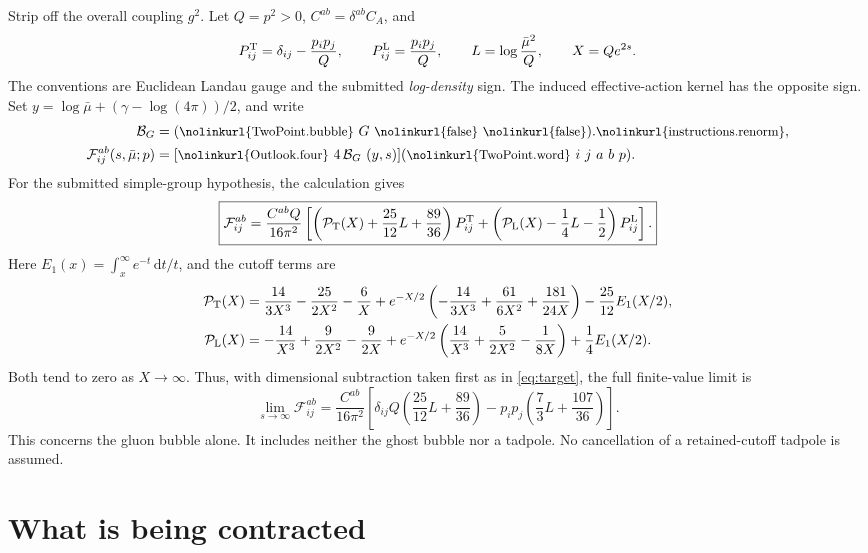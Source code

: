 \documentclass[11pt]{article}
\newcommand{\code}[1]{\ifmmode\text{\small\nolinkurl{#1}}\else{\small\nolinkurl{#1}}\fi}
\newcommand{\dd}{\,\mathrm d}
\begin{document}
Strip off the overall coupling $g^2$. Let $Q=p^2>0$,
$C^{ab}=\delta^{ab}C_A$, and
\[
 P^{\rm T}_{ij}=\delta_{ij}-\frac{p_i p_j}{Q},\qquad
 P^{\rm L}_{ij}=\frac{p_i p_j}{Q},\qquad
 L=\log\frac{\bar\mu^2}{Q},\qquad X=Qe^{2s}.
\]
The conventions are Euclidean Landau gauge and the submitted \emph{log-density}
sign. The induced effective-action kernel has the opposite sign.
Set $y=\log\bar\mu+(\gamma-\log(4\pi))/2$, and write
\begin{equation}
 \begin{aligned}
 \mathcal B_G&=(\code{TwoPoint.bubble}\ G\ \code{false}\ \code{false}).
 \code{instructions.renorm},\\
 \mathcal F^{ab}_{ij}(s,\bar\mu;p)&=
 [\code{Outlook.four}\ 4\,\mathcal B_G\ (y,s)]
 (\code{TwoPoint.word}\ i\ j\ a\ b\ p).
 \end{aligned}
 \label{eq:target}
\end{equation}
For the submitted simple-group hypothesis, the calculation gives
\begin{equation}
 \boxed{\displaystyle
 \mathcal F^{ab}_{ij}
 =\frac{C^{ab}Q}{16\pi^2}
 \left[
 \left(\mathcal P_{\rm T}(X)+\frac{25}{12}L+\frac{89}{36}\right)P^{\rm T}_{ij}
 +\left(\mathcal P_{\rm L}(X)-\frac14 L-\frac12\right)P^{\rm L}_{ij}
 \right].}
 \label{eq:cutoff}
\end{equation}
Here $E_1(x)=\int_x^\infty e^{-t}\dd t/t$, and the cutoff terms are
\begin{align}
 \mathcal P_{\rm T}(X)
 &=\frac{14}{3X^3}-\frac{25}{2X^2}-\frac6X
 +e^{-X/2}\left(-\frac{14}{3X^3}+\frac{61}{6X^2}+\frac{181}{24X}\right)
 -\frac{25}{12}E_1(X/2),\label{eq:PT}\\
 \mathcal P_{\rm L}(X)
 &=-\frac{14}{X^3}+\frac{9}{2X^2}-\frac{9}{2X}
 +e^{-X/2}\left(\frac{14}{X^3}+\frac{5}{2X^2}-\frac{1}{8X}\right)
 +\frac14 E_1(X/2).\label{eq:PL}
\end{align}
Both tend to zero as $X\to\infty$. Thus, with dimensional subtraction taken
first as in \eqref{eq:target}, the full finite-value limit is
\begin{equation}
 \boxed{\displaystyle
 \lim_{s\to\infty}\mathcal F^{ab}_{ij}
 =\frac{C^{ab}}{16\pi^2}
 \left[
 \delta_{ij}Q\left(\frac{25}{12}L+\frac{89}{36}\right)
 -p_i p_j\left(\frac73 L+\frac{107}{36}\right)
 \right].}
 \label{eq:limit}
\end{equation}
This concerns the gluon bubble alone. It includes neither the ghost bubble
nor a tadpole. No cancellation of a retained-cutoff tadpole is assumed.

\section{What is being contracted}
\end{document}
